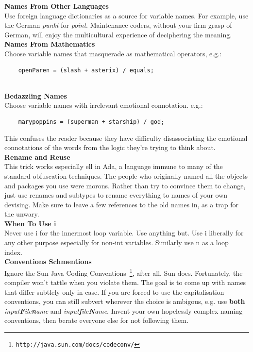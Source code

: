 \documentclass[11pt,twoside,a4paper]{article}
\begin{document}
\textbf{Names From Other Languages}~\\
Use foreign language dictionaries as a source for variable names. For example, use the German \emph{punkt} for \emph{point}. Maintenance coders, without your firm grasp of German, will enjoy the multicultural experience of deciphering the meaning.~\\ 

\textbf{Names From Mathematics}~\\
Choose variable names that masquerade as mathematical operators, e.g.: 
\begin{verbatim}
	openParen = (slash + asterix) / equals;
\end{verbatim}~\\

\textbf{Bedazzling Names}~\\
Choose variable names with irrelevant emotional connotation. e.g.: 
\begin{verbatim}
	marypoppins = (superman + starship) / god; 
\end{verbatim}
This confuses the reader because they have difficulty disassociating the emotional connotations of the words from the logic they're trying to think about.~\\ 

\textbf{Rename and Reuse}~\\
This trick works especially ell in Ada, a language immune to many of the standard obfuscation techniques. The people who originally named all the objects and packages you use were morons. Rather than try to convince them to change, just use renames and subtypes to rename everything to names of your own devising. Make sure to leave a few references to the old names in, as a trap for the unwary.~\\ 

\textbf{When To Use i}~\\
Never use i for the innermost loop variable. Use anything but. Use i liberally for any other purpose especially for non-int variables. Similarly use n as a loop index.~\\ 

\textbf{Conventions Schmentions}~\\
Ignore the Sun Java Coding Conventions~\footnote{\texttt{http://java.sun.com/docs/codeconv/}}, after all, Sun does. Fortunately, the compiler won't tattle when you violate them. The goal is to come up with names that differ subtlely only in case. If you are forced to use the capitalisation conventions, you can still subvert wherever the choice is ambigous, e.g. use \textbf{both} \emph{input\textbf{F}ile\textbf{n}ame} and \emph{input\textbf{f}ile\textbf{N}ame}. Invent your own hopelessly complex naming conventions, then berate everyone else for not following them.~\\ 
\end{document}
